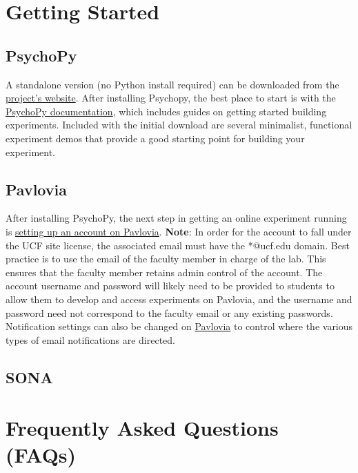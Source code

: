 \documentclass[
]{book}
\begin{document}
\hypertarget{getting-started}{%
\section{Getting Started}\label{getting-started}}

\hypertarget{psychopy-1}{%
\subsection{PsychoPy}\label{psychopy-1}}

A standalone version (no Python install required) can be downloaded from the \href{https://www.psychopy.org/download.html}{project's website}. After installing Psychopy, the best place to start is with the \href{https://www.psychopy.org/documentation.html}{PsychoPy documentation}, which includes guides on getting started building experiments. Included with the initial download are several minimalist, functional experiment demos that provide a good starting point for building your experiment.

\hypertarget{pavlovia}{%
\subsection{Pavlovia}\label{pavlovia}}

After installing PsychoPy, the next step in getting an online experiment running is \href{https://gitlab.pavlovia.org/users/sign_in}{setting up an account on Pavlovia}. \textbf{Note}: In order for the account to fall under the UCF site license,
the associated email must have the *@ucf.edu domain. Best practice is to use the email of the faculty member in charge of the lab. This ensures that the faculty member retains admin control of the account. The account username and password will likely need to be provided to students to allow them to develop and access experiments on Pavlovia, and the username and password need not correspond to the faculty email or any existing passwords. Notification settings can also be changed on \href{https://gitlab.pavlovia.org/profile/emails}{Pavlovia} to control where the various types of email notifications are directed.

\hypertarget{sona-1}{%
\subsection{SONA}\label{sona-1}}

\hypertarget{frequently-asked-questions-faqs}{%
\section{Frequently Asked Questions (FAQs)}\label{frequently-asked-questions-faqs}}
\end{document}
